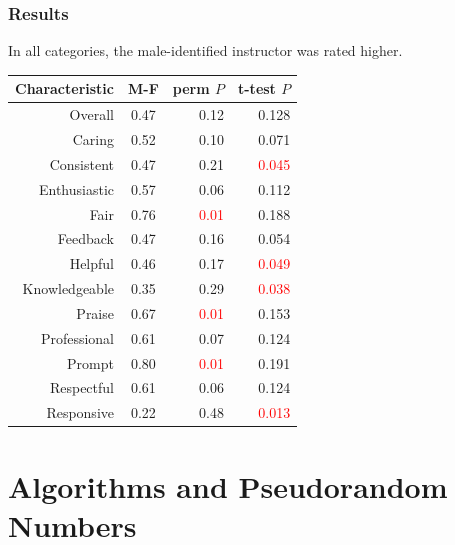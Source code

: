 \documentclass{beamer}
\begin{document}
\frame
{
  \frametitle{Results}
In all categories, the male-identified instructor was rated higher.
\begin{table}
\begin{tabular}{r|crr}
\textbf{Characteristic} & \textbf{M-F} & \textbf{perm} $P$ & \textbf{t-test} $P$ \\
\hline
Overall & 0.47 & 0.12 & 0.128\\
Caring & 0.52 & 0.10 & 0.071\\
Consistent & 0.47 & 0.21 & \textcolor{red}{0.045} \\ 
Enthusiastic & 0.57 & 0.06 & 0.112 \\
Fair & 0.76 & \textcolor{red}{0.01} & 0.188 \\
Feedback & 0.47 & 0.16 & 0.054 \\
Helpful & 0.46 & 0.17 & \textcolor{red}{0.049} \\
Knowledgeable & 0.35 & 0.29 & \textcolor{red}{0.038} \\
Praise & 0.67 & \textcolor{red}{0.01} & 0.153 \\
Professional & 0.61 & 0.07 & 0.124 \\
Prompt & 0.80 & \textcolor{red}{0.01} & 0.191 \\
Respectful & 0.61 & 0.06 & 0.124 \\
Responsive & 0.22 & 0.48 & \textcolor{red}{0.013}
\end{tabular}
\end{table}

}






\section[Software and Statistics]{Algorithms and Pseudorandom Numbers}

\end{document}

